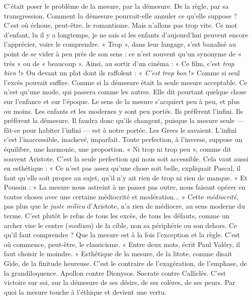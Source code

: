 C'était poser le problème de la mesure, par la démesure. De la règle, par sa
transgression. Comment la démesure pourrait-elle annuler ce qu’elle suppose ?
C’est où échoue, peut-être, le romantisme. Mais n’allons pas trop vite. Ce mot
d'enfant, lu il y a longtemps, je ne sais si les enfants d’aujourd’hui peuvent
encore l’apprécier, voire le comprendre. « Trop », dans leur langage, s’est banalisé
au point de se vider à peu près de son sens : ce n’est souvent qu’un synonyme
de « très » ou de « beaucoup ». Ainsi, au sortir d’un cinéma : « Ce film,
c'est {\it trop bien} !» Ou devant un plat dont ils raffolent : « {\it C'est trop bon} !»
Comme si seul l'excès pouvait suffire. Comme si la démesure était la seule
mesure acceptable. Ce n’est qu’une mode, qui passera comme les autres. Elle
dit pourtant quelque chose sur l'enfance et sur l’époque. Le sens de la mesure
s’acquiert peu à peu, et plus ou moins. Les enfants et les modernes y sont peu
portés. Ils préfèrent l'infini. Ils préfèrent la démesure. Il faudra donc qu’ils
changent, puisque la mesure seule — fât-ce pour habiter l'infini — est à notre
portée. Les Grecs le savaient. L’infini c’est l’inaccessible, inachevé, imparfait.
Toute perfection, à l'inverse, suppose un équilibre, une harmonie, une proportion.
« Ni trop ni trop peu », comme dit souvent Aristote. C’est la seule perfection
qui nous soit accessible. Cela vaut aussi en esthétique : « Ce n’est pas assez
qu’une chose soit belle, expliquait Pascal, il faut qu’elle soit propre au sujet,
qu'il n’y ait rien de trop ni rien de manque. » Et Poussin : « La mesure nous
astreint à ne passer pas outre, nous faisant opérer en toutes choses avec une certaine
médiocrité et modération... » Cette {\it médiocrité}, pas plus que le {\it juste
milieu} d’Aristote, n’a rien de médiocre, au sens moderne du terme. C’est plutôt
le refus de tous les excès, de tous les défauts, comme un archer vise le centre
({\it medium}) de la cible, non sa périphérie ou son dehors. Ce qu'il faut
comprendre ? Que la mesure est à la fois l’exception et la règle. C’est où commence,
peut-être, le classicisme. « Entre deux mots, écrit Paul Valéry, il faut
choisir le moindre. » Esthétique de la mesure, de la litote, comme disait Gide,
de la finitude heureuse. C’est le contraire de l’exagération, de l’emphase, de la
grandiloquence. Apollon contre Dionysos. Socrate contre Calliclès. C’est victoire
sur soi, sur la démesure de ses désirs, de ses colères, de ses peurs. Par quoi
la mesure touche à l’éthique et devient une vertu.

